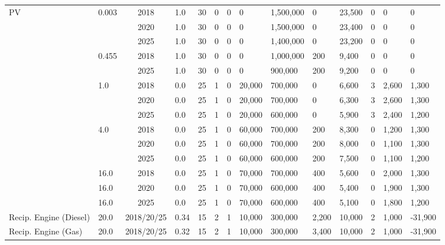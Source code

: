 \begin{table*}[]
\begin{tabularx}{\linewidth}{|p{}|l|c|l|l|l|l|l|l|l|l|l|l|l|}
\multirow{14}{*}{PV} & \multirow{3}{*}{0.003} & 2018 & 1.0 & 30 & 0 & 0 & 0 & 1,500,000 & 0 & 23,500 & 0 & 0 & 0 \\ \cline{3-14} 
&  & 2020 & 1.0 & 30 & 0 & 0 & 0 & 1,500,000 & 0 & 23,400 & 0 & 0 & 0 \\ \cline{3-14} 
&  & 2025 & 1.0 & 30 & 0 & 0 & 0 & 1,400,000 & 0 & 23,200 & 0 & 0 & 0 \\ \cline{2-14} 
& \multirow{2}{*}{0.455} & 2018 & 1.0 & 30 & 0 & 0 & 0 & 1,000,000 & 200 & 9,400 & 0 & 0 & 0 \\ \cline{3-14} 
&  & 2025 & 1.0 & 30 & 0 & 0 & 0 & 900,000 & 200 & 9,200 & 0 & 0 & 0 \\ \cline{2-14} 
& \multirow{3}{*}{1.0} & 2018 & 0.0 & 25 & 1 & 0 & 20,000 & 700,000 & 0 & 6,600 & 3 & 2,600 & 1,300 \\ \cline{3-14} 
&  & 2020 & 0.0 & 25 & 1 & 0 & 20,000 & 700,000 & 0 & 6,300 & 3 & 2,600 & 1,300 \\ \cline{3-14} 
&  & 2025 & 0.0 & 25 & 1 & 0 & 20,000 & 600,000 & 0 & 5,900 & 3 & 2,400 & 1,200 \\ \cline{2-14} 
& \multirow{3}{*}{4.0} & 2018 & 0.0 & 25 & 1 & 0 & 60,000 & 700,000 & 200 & 8,300 & 0 & 1,200 & 1,300 \\ \cline{3-14} 
&  & 2020 & 0.0 & 25 & 1 & 0 & 60,000 & 700,000 & 200 & 8,000 & 0 & 1,100 & 1,300 \\ \cline{3-14} 
&  & 2025 & 0.0 & 25 & 1 & 0 & 60,000 & 600,000 & 200 & 7,500 & 0 & 1,100 & 1,200 \\ \cline{2-14} 
& 16.0 & 2018 & 0.0 & 25 & 1 & 0 & 70,000 & 700,000 & 400 & 5,600 & 0 & 2,000 & 1,300 \\ \cline{2-14} 
& 16.0 & 2020 & 0.0 & 25 & 1 & 0 & 70,000 & 600,000 & 400 & 5,400 & 0 & 1,900 & 1,300 \\ \cline{2-14} 
& 16.0 & 2025 & 0.0 & 25 & 1 & 0 & 70,000 & 600,000 & 400 & 5,100 & 0 & 1,800 & 1,200 \\ \hline
Recip. Engine (Diesel) & 20.0 & 2018/20/25 & 0.34 & 15 & 2 & 1 & 10,000 & 300,000 & 2,200 & 10,000 & 2 & 1,000 & -31,900 \\ \hline
Recip. Engine (Gas) & 20.0 & 2018/20/25 & 0.32 & 15 & 2 & 1 & 10,000 & 300,000 & 3,400 & 10,000 & 2 & 1,000 & -31,900 \\ \hline
		\end{tabularx}
		\label{table:modern_plant_costs}
\end{table*}


